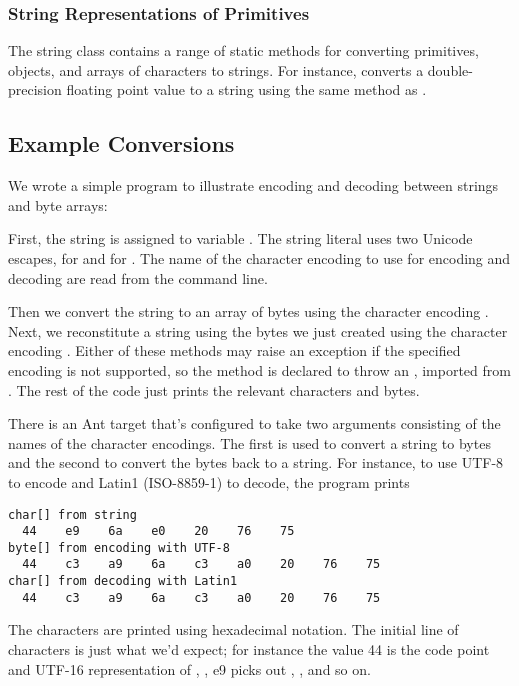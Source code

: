 \subsubsection{String Representations of Primitives}

The string class contains a range of static 
methods for converting primitives, objects, and arrays of characters
to strings.  For instance,  converts a
double-precision floating point value to a string using the same
method as .

\subsection{Example Conversions}

We wrote a simple program to illustrate encoding and decoding between
strings and byte arrays:
%

%
%
First, the string  is
assigned to variable
.  The string literal uses two Unicode escapes, 
 for  and  for 
.  The name of the character encoding to use for
encoding and decoding are read from the command line.  

Then we convert the string  to an array of bytes
 using the character encoding .  Next, we
reconstitute a string using the bytes we just created using the
character encoding .  Either of these methods may raise
an exception if the specified encoding is not supported, so the 
 method is declared to throw an
, imported from .
The rest of the code just prints the relevant characters and bytes.

There is an Ant target  that's configured to take
two arguments consisting of the names of the character encodings.  The
first is used to convert a string to bytes and the second to convert
the bytes back to a string.  For instance, to use UTF-8 to encode and
Latin1 (ISO-8859-1) to decode, the program prints 
%
\begin{verbatim}
char[] from string
  44    e9    6a    e0    20    76    75
byte[] from encoding with UTF-8
  44    c3    a9    6a    c3    a0    20    76    75
char[] from decoding with Latin1
  44    c3    a9    6a    c3    a0    20    76    75
\end{verbatim}
%
The characters are printed using hexadecimal notation.  The initial
line of characters is just what we'd expect; for instance the
 value 44 is the code point and UTF-16 representation of
, ,  e9
picks out , , and so on.

